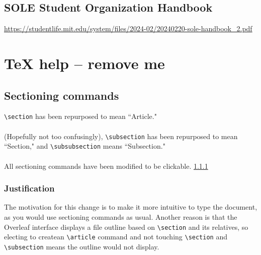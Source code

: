 \documentclass[12pt]{article}
\begin{document}
\subsection{SOLE Student Organization Handbook}
\url{https://studentlife.mit.edu/system/files/2024-02/20240220-sole-handbook_2.pdf}

\section{TeX help -- remove me}
\subsection{Sectioning commands}
\verb|\section| has been repurposed to mean ``Article."
\\
\\
(Hopefully not too confusingly), \verb|\subsection| has been repurposed to mean ``Section," and \verb|\subsubsection| means ``Subsection."
\\
\\
All sectioning commands have been modified to be clickable.
\ref{justification}

\subsubsection{Justification}
\label{justification}
The motivation for this change is to make it more intuitive to type the document, as you would use sectioning commands as usual.
Another reason is that the Overleaf interface displays a file outline based on \verb|\section| and its relatives, so electing to createan \verb|\article| command and not touching \verb|\section| and \verb|\subsection| means the outline would not display.
\end{document}
